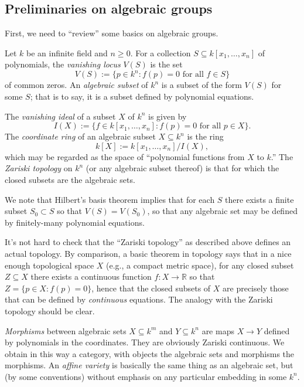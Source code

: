 \documentclass[reqno]{amsart} 
\begin{document}
\subsection{Preliminaries on algebraic groups}
First, we need to ``review'' some basics on algebraic groups.
\begin{definition}
  Let $k$ be an infinite field and $n \geq 0$.  For a collection $S \subseteq k[x_1,\dotsc,x_n]$ of polynomials, the \emph{vanishing locus} $V(S)$ is the set
  \begin{equation*}
    V(S) := \{p \in k^n : f(p) = 0 \text{ for all } f \in S\}
  \end{equation*}
  of common zeros.  An \emph{algebraic subset} of $k^n$ is a subset of the form $V(S)$ for some $S$; that is to say, it is a subset defined by polynomial equations.

  The \emph{vanishing ideal} of a subset $X$ of $k^n$ is given by
  \begin{equation*}
    I(X) := \{f \in k[x_1,\dotsc,x_n] : f(p) = 0 \text{ for all } p \in X\}.
  \end{equation*}
  The \emph{coordinate ring} of an algebraic subset $X \subseteq k^n$ is the ring
  \begin{equation*}
k[X] := k[x_1,\dotsc,x_n]/I(X),
\end{equation*}
 which may be regarded as the space of ``polynomial functions from $X$ to $k$.''  The \emph{Zariski topology} on $k^n$ (or any algebraic subset thereof) is that for which the closed subsets are the algebraic sets.
\end{definition}

We note that Hilbert's basis theorem implies that for each $S$ there exists a finite subset $S_0 \subset S$ so that $V(S) = V(S_0)$, so that any algebraic set may be defined by finitely-many polynomial equations.

It's not hard to check that the ``Zariski topology'' as described above defines an actual topology.  By comparison, a basic theorem in topology says that in a nice enough topological space $X$ (e.g., a compact metric space), for any closed subset $Z \subseteq X$ there exists a continuous function $f : X \rightarrow \mathbb{R}$ so that $Z = \{p \in X : f(p) = 0 \}$, hence that the closed subsets of $X$ are precisely those that can be defined by \emph{continuous} equations.  The analogy with the Zariski topology should be clear.

\emph{Morphisms} between algebraic sets $X \subseteq k^m$ and $Y \subseteq k^n$ are maps $X \rightarrow Y$ defined by polynomials in the coordinates.  They are obviously Zariski continuous.  We obtain in this way a category, with objects the algebraic sets and morphisms the morphisms.  An \emph{affine variety} is basically the same thing as an algebraic set, but (by some conventions) without emphasis on any particular embedding in some $k^n$.
\end{document}
